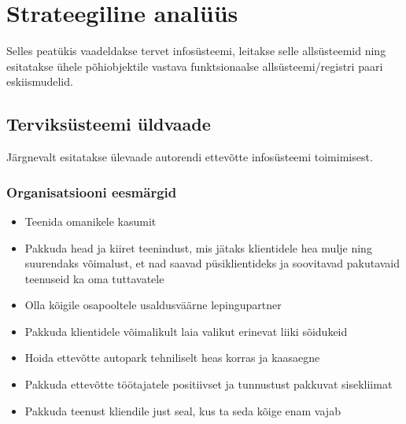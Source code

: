 \documentclass{report}
\begin{document}
 
\tableofcontents{}
 
\chapter{Strateegiline analüüs}
Selles peatükis vaadeldakse tervet infosüsteemi, leitakse selle allsüsteemid ning esitatakse ühele põhiobjektile vastava funktsionaalse allsüsteemi/registri paari eskiismudelid.

\section{Terviksüsteemi üldvaade}
Järgnevalt esitatakse ülevaade autorendi ettevõtte infosüsteemi toimimisest.

\subsection{Organisatsiooni eesmärgid}
\begin{itemize}
	\item Teenida omanikele kasumit
	\item Pakkuda head ja kiiret teenindust, mis jätaks klientidele hea mulje ning suurendaks võimalust, et nad saavad püsiklientideks ja soovitavad pakutavaid teenuseid ka oma tuttavatele
	\item Olla kõigile osapooltele usaldusväärne lepingupartner
	\item Pakkuda klientidele võimalikult laia valikut erinevat liiki sõidukeid
	\item Hoida ettevõtte autopark tehniliselt heas korras ja kaasaegne
	\item Pakkuda ettevõtte töötajatele positiivset ja tunnustust pakkuvat sisekliimat
	\item Pakkuda teenust kliendile just seal, kus ta seda kõige enam vajab
\end{itemize}
 
\end{document}
